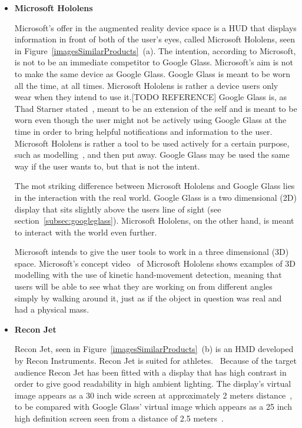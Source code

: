 \begin{itemize}
\item \textbf{Microsoft Hololens}~\cite{hololens} 

Microsoft's offer in the augmented reality device space is a HUD that displays information in front of both of the user's eyes, called Microsoft Hololens, seen in Figure~\ref{imagesSimilarProducts}~(a). The intention, according to Microsoft, is not to be an immediate competitor to Google Glass. Microsoft's aim is not to make the same device as Google Glass. Google Glass is meant to be worn all the time, at all times. Microsoft Hololens is rather a device users only wear when they intend to use it.[TODO REFERENCE] Google Glass is, as Thad Starner stated~\cite{6504855}, meant to be an extension of the self and is meant to be worn even though the user might not be actively using Google Glass at the time in order to bring helpful notifications and information to the user. Microsoft Hololens is rather a tool to be used actively for a certain purpose, such as modelling~\cite{hololensDemo}, and then put away. Google Glass may be used the same way if the user wants to, but that is not the intent.

The mot striking difference between Microsoft Hololens and Google Glass lies in the interaction with the real world. Google Glass is a two dimensional (2D) display that sits slightly above the users line of sight (see section~\ref{subsec:googleglass}). Microsoft Hololens, on the other hand, is meant to interact with the world even further.

Microsoft intends to give the user tools to work in a three dimensional (3D) space. Microsoft's concept video~\cite{hololensConceptVideo} of Microsoft Hololens shows examples of 3D modelling with the use of kinetic hand-movement detection, meaning that users will be able to see what they are working on from different angles simply by walking around it, just as if the object in question was real and had a physical mass.

\item \textbf{Recon Jet}~\cite{reconJet}

Recon Jet, seen in Figure~\ref{imagesSimilarProducts}~(b) is an HMD developed by Recon Instruments. Recon Jet is suited for athletes.~\cite{reconJet} Because of the target audience Recon Jet has been fitted with a display that has high contrast in order to give good readability in high ambient lighting. The display's virtual image appears as  a 30 inch wide screen at approximately 2 meters distance~\cite{reconJetSpecs}, to be compared with Google Glass' virtual image which appears as a 25 inch high definition screen seen from a distance of 2.5 meters~\cite{GlassSpecs}.


\end{itemize}
